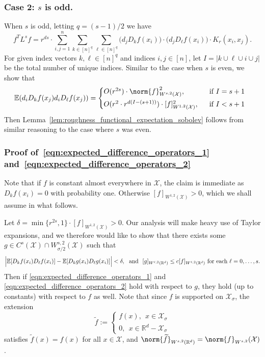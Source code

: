 \documentclass{article}
\newcommand{\Reals}{\mathbb{R}}
\newcommand{\abs}[1]{\left \lvert #1 \right \rvert}
\newcommand{\1}{\mathbf{1}}
\newcommand{\Rd}{\Reals^d}
\newcommand{\Xset}{\mathcal{X}}
\newcommand{\Ebb}{\mathbb{E}}
\newcommand{\wt}[1]{\widetilde{#1}}
\theoremstyle{alden}
\theoremstyle{aldenthm}
\theoremstyle{definition}
\theoremstyle{remark}
\begin{document}
\subsubsection{Case 2: $s$ is odd.}
When $s$ is odd, letting $q = (s - 1)/2$ we have
\begin{equation}
\label{eqn:roughness_functional_representation_odd}
f^T L^s f =  r^{ds} \cdot \sum_{i,j = 1}^{n} \sum_{k \in [n]^q} \sum_{\ell \in [n]^q} \bigl(d_jD_kf(x_i)\bigr) \cdot  \bigl(d_jD_{\ell}f(x_i)\bigr) \cdot K_r(x_i,x_j).
\end{equation}
For given index vectors $k,\ell \in [n]^q$ and indices $i,j \in [n]$, let $I = \abs{k \cup \ell \cup i \cup j}$ be the total number of unique indices. Similar to the case when $s$ is even, we show that 
\begin{equation}
\label{eqn:expected_difference_operators_2}
\Ebb(d_iD_kf(x_j) d_iD_\ell f(x_j)) =
\begin{cases*}
O(r^{2s}) \cdot \norm{f}_{W^{s,2}(\Xset)}^2, & ~~\textrm{if $I = s + 1$} \\
O(r^{2} \cdot r^{d(I - (s + 1))}) \cdot [f]_{W^{1,2}(\Xset)}^2, & ~~\textrm{if $I < s + 1$}~ 
\end{cases*}
\end{equation}
Then Lemma~\ref{lem:roughness_functional_expectation_sobolev} follows from similar reasoning to the case where $s$ was even.

\subsubsection{Proof of~\eqref{eqn:expected_difference_operators_1} and~\eqref{eqn:expected_difference_operators_2}}
\label{subsec:expected_difference_operators_pf}

Note that if $f$ is constant almost everywhere in $\Xset$, the claim is immediate as $D_kf(x_i) = 0$ with probability one. Otherwise $[f]_{W^{1,2}(\Xset)} > 0$, which we shall assume in what follows.

Let $\delta = \min\{r^{2s},1\}\cdot[f]_{W^{1,2}(\Xset)} > 0$. Our analysis will make heavy use of Taylor expansions, and we therefore would like to show that there exists some $g \in C^{s}(\Xset) \cap W_{\sigma/2}^{s,2}(\Xset)$ such that
\begin{equation*}
\Bigl|\Ebb[D_kf(x_i) D_{\ell} f(x_i)] - \Ebb[D_kg(x_i) D_\ell g(x_i)]\Bigr| <  \delta, ~~\textrm{and}~~[g]_{W^{\ell,2}(\Rd)} \leq c [f]_{W^{\ell,2}(\Rd)}~\textrm{for each $\ell = 0,\ldots,s$.}
\end{equation*}
Then if \eqref{eqn:expected_difference_operators_1} and \eqref{eqn:expected_difference_operators_2} hold with respect to $g$, they hold (up to constants) with respect to $f$ as well. 
Note that since $f$ is supported on $\Xset_{\sigma}$, the extension
\begin{equation*}
\wt{f} := 
\begin{cases*}
f(x),~~ x \in \Xset_{\sigma} \\
0,~~ x \in \Rd - \Xset_{\sigma}
\end{cases*}
\end{equation*}
satisfies $\wt{f}(x) = f(x)$ for all $x \in \Xset$, and $\norm{\wt{f}}_{W^{s,2}(\Rd)} = \norm{f}_{W^{s,2}}(\Xset)$.  
\end{document}
